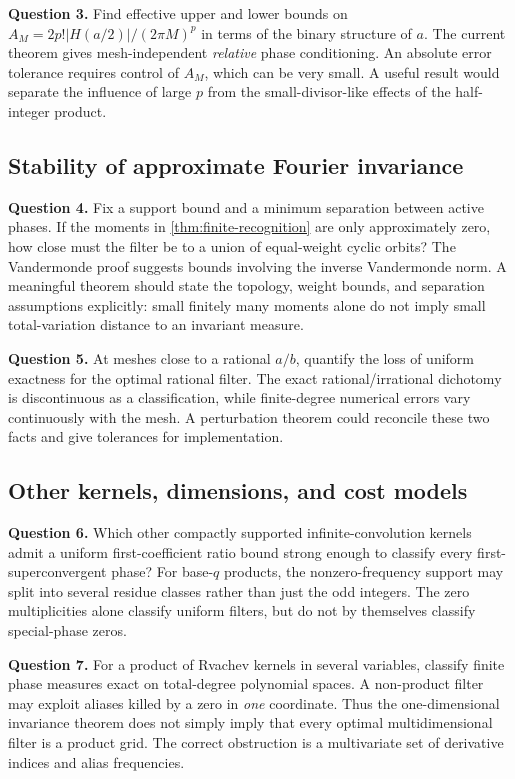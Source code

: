 \documentclass[11pt,a4paper]{article}
\numberwithin{equation}{section}
\theoremstyle{plain}
\theoremstyle{definition}
\theoremstyle{remark}
\begin{document}
\textbf{Question 3.} Find effective upper and lower bounds on
$A_M=2p!|H(a/2)|/(2\pi M)^p$ in terms of the binary structure of $a$.
The current theorem gives mesh-independent \emph{relative} phase
conditioning. An absolute error tolerance requires control of $A_M$,
which can be very small. A useful result would separate the influence of
large $p$ from the small-divisor-like effects of the half-integer product.

\subsection{Stability of approximate Fourier invariance}

\textbf{Question 4.} Fix a support bound and a minimum separation between
active phases. If the moments in \cref{thm:finite-recognition} are only
approximately zero, how close must the filter be to a union of equal-weight
cyclic orbits? The Vandermonde proof suggests bounds involving the inverse
Vandermonde norm. A meaningful theorem should state the topology, weight
bounds, and separation assumptions explicitly: small finitely many
moments alone do not imply small total-variation distance to an invariant
measure.

\textbf{Question 5.} At meshes close to a rational $a/b$, quantify the
loss of uniform exactness for the optimal rational filter. The exact
rational/irrational dichotomy is discontinuous as a classification, while
finite-degree numerical errors vary continuously with the mesh. A
perturbation theorem could reconcile these two facts and give tolerances
for implementation.

\subsection{Other kernels, dimensions, and cost models}

\textbf{Question 6.} Which other compactly supported infinite-convolution
kernels admit a uniform first-coefficient ratio bound strong enough to
classify every first-superconvergent phase? For base-$q$ products, the
nonzero-frequency support may split into several residue classes rather
than just the odd integers. The zero multiplicities alone classify
uniform filters, but do not by themselves classify special-phase zeros.

\textbf{Question 7.} For a product of Rvachev kernels in several variables,
classify finite phase measures exact on total-degree polynomial spaces.
A non-product filter may exploit aliases killed by a zero in \emph{one}
coordinate. Thus the one-dimensional invariance theorem does not simply
imply that every optimal multidimensional filter is a product grid.
The correct obstruction is a multivariate set of derivative indices and
alias frequencies.
\end{document}
